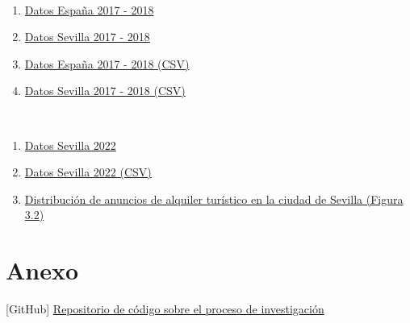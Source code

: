 \documentclass[a4paper,10pt]{article}
\begin{document}

    \clearpage
    \begin{thebibliography}{20}

            \ 
            \begin{enumerate}
                \item \href{https://datahippo.org/es/region/599216cb8a4655339b819813/}{Datos España 2017 - 2018}
                \item \href{https://datahippo.org/es/region/599230af8a46554edf884651/}{Datos Sevilla 2017 - 2018}
                \item \href{https://datahippo.org/media/regions/58612732-b2dc-433b-ab78-b8fbe5bbbb16/599216cb8a4655339b819813_airbnb.csv}{Datos España 2017 - 2018 (CSV)}
                \item \href{https://datahippo.org/media/regions/7e3f7365-8ec0-42f1-a277-9b82743b8a39/599230af8a46554edf884651_airbnb.csv}{Datos Sevilla 2017 - 2018 (CSV)}
            \end{enumerate}
        
            \
            \begin{enumerate}
                \item \href{http://insideairbnb.com/get-the-data/}{Datos Sevilla 2022}
                \item \href{http://data.insideairbnb.com/spain/andaluc%C3%ADa/sevilla/2023-03-31/visualisations/listings.csv}{Datos Sevilla 2022 (CSV)}
                \item \href{http://insideairbnb.com/sevilla}{Distribución de anuncios de alquiler turístico en la ciudad de Sevilla (Figura 3.2)}
            \end{enumerate}

    \end{thebibliography}
    
    \hypertarget{anexo}{}
    \section*{Anexo}

        \hypertarget{github}{[GitHub] \href{https://github.com/m7pantoja/TouristRental}{Repositorio de código sobre el proceso de investigación}}
\end{document}
